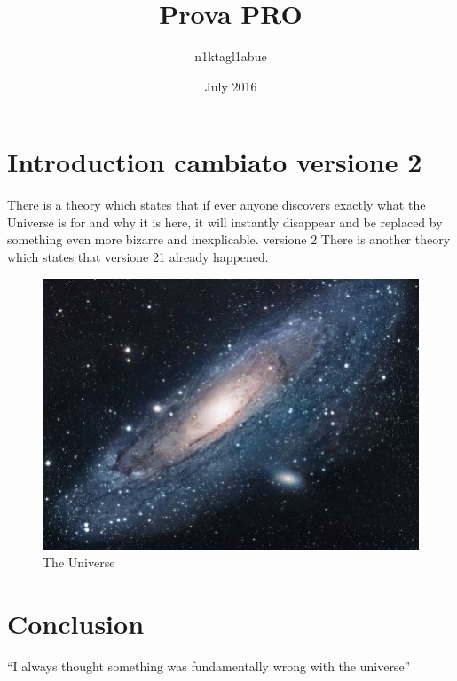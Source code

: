 \documentclass{article}
\title{Prova PRO}
\author{n1ktagl1abue }
\date{July 2016}
\begin{document}
\maketitle

\section{Introduction cambiato versione 2}
There is a theory which states that if ever anyone discovers exactly what the Universe is for and why it is here, it will instantly disappear and be replaced by something even more bizarre and inexplicable.
versione 2
There is another theory which states that versione 21 already happened.

\begin{figure}[h!]
\centering
\includegraphics[scale=1.7]{universe.jpg}
\caption{The Universe}
\label{fig:univerise}
\end{figure}

\section{Conclusion}
``I always thought something was fundamentally wrong with the universe'' \citep{adams1995hitchhiker}



\end{document}
